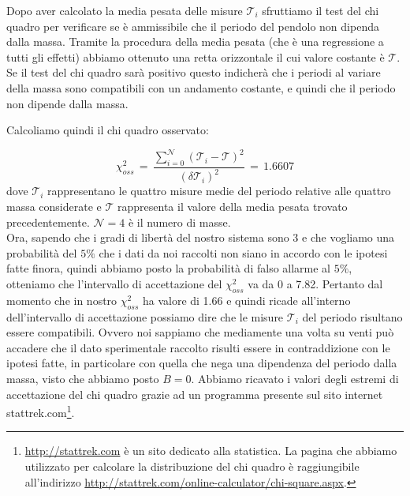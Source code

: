 Dopo aver calcolato la media pesata delle misure $\mathcal{T}_i$ sfruttiamo il test del chi quadro per verificare se
è ammissibile che il periodo del pendolo non dipenda dalla massa. Tramite la procedura della media pesata (che è una regressione
a tutti gli effetti) abbiamo ottenuto
una retta orizzontale il cui valore costante è $\mathcal{T}$. Se il test del chi quadro sarà positivo questo indicherà
che i periodi al variare della massa sono compatibili con un andamento costante, e quindi che il periodo non dipende dalla massa.


%
Calcoliamo quindi il chi quadro osservato:

\begin{equation*}
	\chi_{oss}^2 \,=\, \frac{\sum_{i=0}^{\mathcal{N}} (\mathcal{T}_i - \mathcal{T})^2}{(\delta \mathcal{T}_i)^2} \,=\, 1.6607
\end{equation*}
%
dove $\mathcal{T}_i$ rappresentano le quattro misure medie del periodo relative alle quattro massa considerate e $\mathcal{T}$ rappresenta il valore della media pesata trovato precedentemente. $\mathcal{N} = 4$ è il numero di masse.\\

Ora, sapendo che i gradi di libertà del nostro sistema sono 3 e che vogliamo una probabilità del $5\%$ che i dati da noi raccolti non siano in accordo con le ipotesi fatte finora, quindi abbiamo posto la probabilità di falso allarme al $5\%$, otteniamo che l'intervallo di accettazione del $\chi_{oss}^2$ va da 0 a 7.82. Pertanto dal momento che in nostro $\chi_{oss}^2$ ha valore di 1.66 e quindi ricade all'interno dell'intervallo di accettazione possiamo dire che le misure $\mathcal{T}_i$ del periodo risultano essere compatibili. Ovvero noi sappiamo che mediamente una volta su venti può accadere che il dato sperimentale raccolto risulti essere in contraddizione con le ipotesi fatte, in particolare con quella che nega una dipendenza del periodo dalla massa, visto che abbiamo posto $B = 0$.
Abbiamo ricavato i valori degli estremi di accettazione del chi quadro grazie ad un programma presente sul sito internet stattrek.com\footnote{
\url{http://stattrek.com} è un sito dedicato alla statistica. La pagina che abbiamo utilizzato per calcolare la distribuzione del chi quadro
è raggiungibile all'indirizzo \url{http://stattrek.com/online-calculator/chi-square.aspx}.
}.

